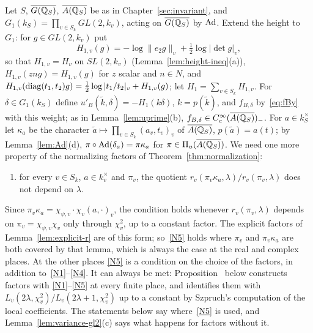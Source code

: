 Let $S$, $\overline{G(\mathbb{Q}_S)}$, $\overline{A(\mathbb{Q}_S)}$ be as in Chapter~\ref{sec:invariant}, and
$G_1(k_S)=\prod_{v\in S_k}GL(2,k_v)$, acting on $\overline{G(\mathbb{Q}_S)}$ by $\operatorname{Ad}$.
Extend the height to $G_1$: for $g\in GL(2,k_v)$ put
\[
H_{1,v}(g)=-\log\|e_2g\|_v+\tfrac12\log|\det g|_v,
\]
so that $H_{1,v}=H_v$ on $SL(2,k_v)$ (Lemma~\ref{lem:height-ineq}(a)),
$H_{1,v}(zng)=H_{1,v}(g)$ for $z$ scalar and $n\in N$, and
$H_{1,v}(\operatorname{diag}(t_1,t_2)g)=\frac12\log|t_1/t_2|_v+H_{1,v}(g)$; let
$H_1=\sum_{v\in S_k}H_{1,v}$. For $\delta\in G_1(k_S)$ define
$u'_B(\tilde k,\delta)=-H_1(k\delta)$, $k=p(\tilde k)$, and $f_{B,\delta}$
by~\eqref{eq:fBy} with this weight; as in Lemma~\ref{lem:uprime}(b),
$f_{B,\delta}\in C_c^\infty(\overline{A(\mathbb{Q}_S)})_-$. For $a\in k_S^\times$ let $\kappa_a$
be the character $\tilde a\mapsto\prod_{v\in S_k}(a_v,t_v)_v$ of $\overline{A(\mathbb{Q}_S)}$,
$p(\tilde a)=a(t)$; by Lemma~\ref{lem:Ad}(d), $\pi\circ
\operatorname{Ad}(\delta_a)=\pi\kappa_a$ for $\pi\in\Pi_u(\overline{A(\mathbb{Q}_S)})$. We need one
more property of the normalizing factors of
Theorem~\ref{thm:normalization}:
\begin{enumerate}[label=(N\arabic*),start=5]
\item\label{N5} for every $v\in S_k$, $a\in k_v^\times$ and $\pi_v$, the
  quotient $r_v(\pi_v\kappa_a,\lambda)/r_v(\pi_v,\lambda)$ does not depend
  on $\lambda$.
\end{enumerate}
Since $\pi_v\kappa_a=\chi_{\psi,v}\cdot\chi_v(a,\cdot)_v$, the condition
holds whenever $r_v(\pi_v,\lambda)$ depends on $\pi_v=\chi_{\psi,v}\chi_v$
only through $\chi_v^2$, up to a constant factor. The explicit factors of
Lemma~\ref{lem:explicit-r} are of this form; so~\ref{N5} holds where
$\pi_v$ and $\pi_v\kappa_a$ are both covered by that lemma, which is
always the case at the real and complex places. At the other places
\ref{N5} is a condition on the choice of the factors, in addition
to~\ref{N1}--\ref{N4}. It can always be met:
Proposition~\normref{} below constructs factors with
\ref{N1}--\ref{N5} at every finite place, and identifies them with
$L_v(2\lambda,\chi_v^2)/L_v(2\lambda+1,\chi_v^2)$ up to a constant by
Szpruch's computation of the local coefficients. The statements below say
where~\ref{N5} is used, and Lemma~\ref{lem:variance-gl2}(c) says what
happens for factors without it.

